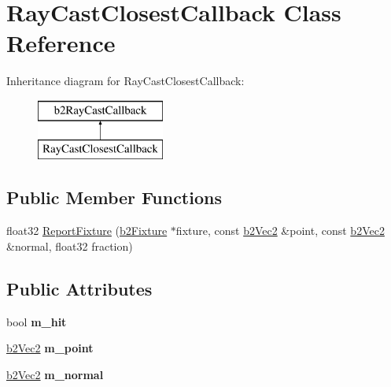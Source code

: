 \hypertarget{class_ray_cast_closest_callback}{\section{Ray\-Cast\-Closest\-Callback Class Reference}
\label{class_ray_cast_closest_callback}
}
Inheritance diagram for Ray\-Cast\-Closest\-Callback\-:\begin{figure}[H]
\begin{center}
\leavevmode
\includegraphics[height=2.000000cm]{class_ray_cast_closest_callback}
\end{center}
\end{figure}
\subsection*{Public Member Functions}
\begin{DoxyCompactItemize}
\item 
float32 \hyperlink{class_ray_cast_closest_callback_aeea437e031fb1e2f3ab1f0c9b547e73b}{Report\-Fixture} (\hyperlink{classb2_fixture}{b2\-Fixture} $\ast$fixture, const \hyperlink{structb2_vec2}{b2\-Vec2} \&point, const \hyperlink{structb2_vec2}{b2\-Vec2} \&normal, float32 fraction)
\end{DoxyCompactItemize}
\subsection*{Public Attributes}
\begin{DoxyCompactItemize}
\item 
\hypertarget{class_ray_cast_closest_callback_a876aa9bc7ac8154f4a82f76a201360f7}{bool {\bfseries m\-\_\-hit}}\label{class_ray_cast_closest_callback_a876aa9bc7ac8154f4a82f76a201360f7}

\item 
\hypertarget{class_ray_cast_closest_callback_a84e3af60178887d0917d38a8f98174c8}{\hyperlink{structb2_vec2}{b2\-Vec2} {\bfseries m\-\_\-point}}\label{class_ray_cast_closest_callback_a84e3af60178887d0917d38a8f98174c8}

\item 
\hypertarget{class_ray_cast_closest_callback_a80c7f86da3ed2e5252fd783182d02018}{\hyperlink{structb2_vec2}{b2\-Vec2} {\bfseries m\-\_\-normal}}\label{class_ray_cast_closest_callback_a80c7f86da3ed2e5252fd783182d02018}

\end{DoxyCompactItemize}


